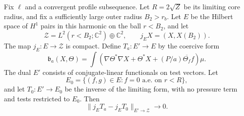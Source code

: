 \begin{lemma}\label{spec:inverse-limit}
Fix $\ell$ and a convergent profile subsequence. Let $R=2\sqrt Z$ be
its limiting core radius, and fix a sufficiently large outer radius
$B_2>r_b$. Let $E$ be the Hilbert space of $H^1$ pairs in this harmonic
on the ball $r<B_2$, and let
\[
 \mathscr Z=L^2(r<B_2;\mathbb C^2)\oplus\mathbb C^2,\qquad
 j_E X=(X,X(B_2)).
\]
The map $j_E:E\to\mathscr Z$ is compact. Define $T_a:E'\to E$ by the
coercive form
\begin{equation}\label{spec:base-form}
 \mathfrak b_a(X,\Theta)=
 \int\left(\nabla\Theta^*\nabla X+\Theta^*X
                         +(P/a)\overline{\Theta_f}f\right)\mu.
\end{equation}
The dual $E'$ consists of conjugate-linear functionals on test vectors.
Let
\[
 E_0=\{(f,g)\in E:f=0\text{ a.e. on }r<R\},
\]
and let $T_0:E'\to E_0$ be the inverse of the limiting form, with no
pressure term and tests restricted to $E_0$. Then
\begin{equation}\label{spec:inverse-norm}
 \|j_ET_a-j_ET_0\|_{E'\to\mathscr Z}\longrightarrow0.
\end{equation}
\end{lemma}

